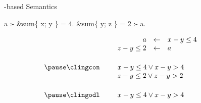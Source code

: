 \begin{frame}[fragile]{\HTC-based Semantics}
  \smallskip
  \begin{semiverbatim}
                           a :- &sum\{ x; y \} = 4.
            &sum\{ y; z \} = 2 :- a.
  \end{semiverbatim}
  \bigskip\pause
  \[
    \begin{array}{rp{5pt}rclp{20pt}}
                     && a         &\leftarrow&  x-y\leq 4          &\\
                     && z-y\leq2  &\leftarrow&  a                  &\\[15pt]\pause
    \text{\clingcon} && \multicolumn{3}{l}{x-y\leq 4 \lor x-y > 4} &\\
                     && \multicolumn{3}{l}{z-y\leq 2 \lor z-y>2}   &\\[15pt]\pause
    \text{\clingodl} && \multicolumn{3}{l}{x-y\leq 4 \lor x-y > 4} &
    \end{array}
  \]
\end{frame}
%
